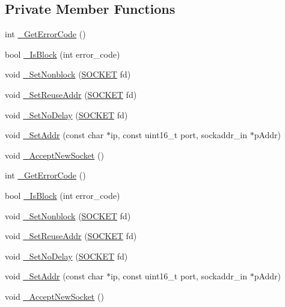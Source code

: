 \subsection*{Private Member Functions}
\begin{DoxyCompactItemize}
\item 
int \hyperlink{class_c_base_socket_a98136f6af14a435c04c375b0e12a4b8e}{\+\_\+\+Get\+Error\+Code} ()
\item 
bool \hyperlink{class_c_base_socket_a4ac3112f184fbd21814d3aa804259bdc}{\+\_\+\+Is\+Block} (int error\+\_\+code)
\item 
void \hyperlink{class_c_base_socket_a71af7699ce3021b15254c181f6986b9b}{\+\_\+\+Set\+Nonblock} (\hyperlink{base_2ostype_8h_a8dc8083897335125630f1af5dafd5831}{S\+O\+C\+K\+E\+T} fd)
\item 
void \hyperlink{class_c_base_socket_a2e9150a1f186551710c423c8bf904222}{\+\_\+\+Set\+Reuse\+Addr} (\hyperlink{base_2ostype_8h_a8dc8083897335125630f1af5dafd5831}{S\+O\+C\+K\+E\+T} fd)
\item 
void \hyperlink{class_c_base_socket_a1c72ac8a5b9882e8c20e8a3d74a8018f}{\+\_\+\+Set\+No\+Delay} (\hyperlink{base_2ostype_8h_a8dc8083897335125630f1af5dafd5831}{S\+O\+C\+K\+E\+T} fd)
\item 
void \hyperlink{class_c_base_socket_a82f7a6d27dbdc84e348098cbbbaae7a6}{\+\_\+\+Set\+Addr} (const char $\ast$ip, const uint16\+\_\+t port, sockaddr\+\_\+in $\ast$p\+Addr)
\item 
void \hyperlink{class_c_base_socket_a46a1139923baf199da3363f8247a1a9c}{\+\_\+\+Accept\+New\+Socket} ()
\item 
int \hyperlink{class_c_base_socket_a98136f6af14a435c04c375b0e12a4b8e}{\+\_\+\+Get\+Error\+Code} ()
\item 
bool \hyperlink{class_c_base_socket_a4ac3112f184fbd21814d3aa804259bdc}{\+\_\+\+Is\+Block} (int error\+\_\+code)
\item 
void \hyperlink{class_c_base_socket_a71af7699ce3021b15254c181f6986b9b}{\+\_\+\+Set\+Nonblock} (\hyperlink{base_2ostype_8h_a8dc8083897335125630f1af5dafd5831}{S\+O\+C\+K\+E\+T} fd)
\item 
void \hyperlink{class_c_base_socket_a2e9150a1f186551710c423c8bf904222}{\+\_\+\+Set\+Reuse\+Addr} (\hyperlink{base_2ostype_8h_a8dc8083897335125630f1af5dafd5831}{S\+O\+C\+K\+E\+T} fd)
\item 
void \hyperlink{class_c_base_socket_a1c72ac8a5b9882e8c20e8a3d74a8018f}{\+\_\+\+Set\+No\+Delay} (\hyperlink{base_2ostype_8h_a8dc8083897335125630f1af5dafd5831}{S\+O\+C\+K\+E\+T} fd)
\item 
void \hyperlink{class_c_base_socket_a82f7a6d27dbdc84e348098cbbbaae7a6}{\+\_\+\+Set\+Addr} (const char $\ast$ip, const uint16\+\_\+t port, sockaddr\+\_\+in $\ast$p\+Addr)
\item 
void \hyperlink{class_c_base_socket_a46a1139923baf199da3363f8247a1a9c}{\+\_\+\+Accept\+New\+Socket} ()
\end{DoxyCompactItemize}
